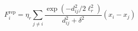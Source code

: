 \documentclass{article}
\begin{document}
\begin{equation*}
F_i^{\mathrm{rep}}=\eta_r\sum_{j\ne i}\frac{\exp\!\left(-d_{ij}^2/2\ell_r^2\right)}{d_{ij}^2+\delta^2}\left(x_i-x_j\right)
\end{equation*}
\end{document}
